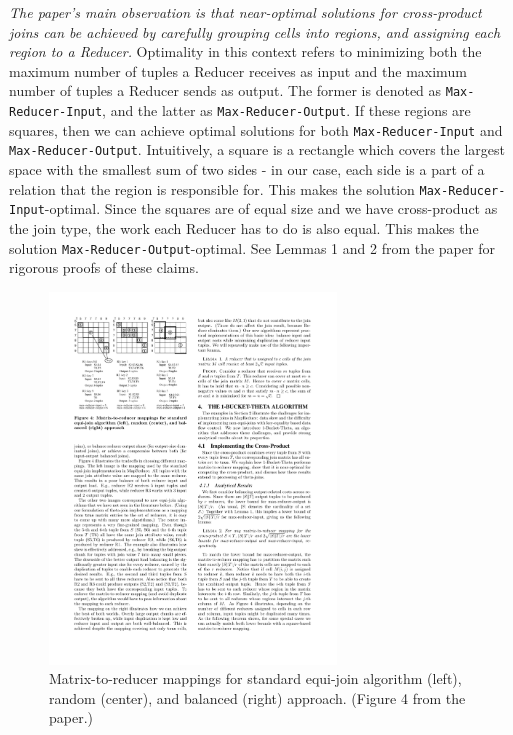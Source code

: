 \documentclass[a4paper,10pt]{article}
\begin{document}
{\it The paper's main observation is that near-optimal solutions for cross-product joins can be achieved by carefully grouping cells into \textit{regions}, and  assigning each region to a Reducer.} Optimality in this context refers to minimizing both the maximum number of tuples a Reducer receives as input and the maximum number of tuples a Reducer sends as output. The former is denoted as \verb#Max-Reducer-Input#, and the latter as \verb#Max-Reducer-Output#. If these regions are squares, then we can achieve optimal solutions for both \verb#Max-Reducer-Input# and \verb#Max-Reducer-Output#. Intuitively, a square is a rectangle which covers the largest space with the smallest sum of two sides - in our case, each side is a part of a relation that the region is responsible for. This makes the solution \verb#Max-Reducer-Input#-optimal. Since the squares are of equal size and we have cross-product as the join type, the work each Reducer has to do is also equal. This makes the solution \verb#Max-Reducer-Output#-optimal. See Lemmas 1 and 2 from the paper for rigorous proofs of these claims.

\begin{figure}
\centering
\includegraphics[width=3in]{figure-4}
\vspace{-3mm}
\caption{Matrix-to-reducer mappings for standard equi-join algorithm (left), random (center), and balanced (right) approach. (Figure 4 from the paper.)}
\label{figure-4}
\vspace{-2mm}
\end{figure}

\end{document}
